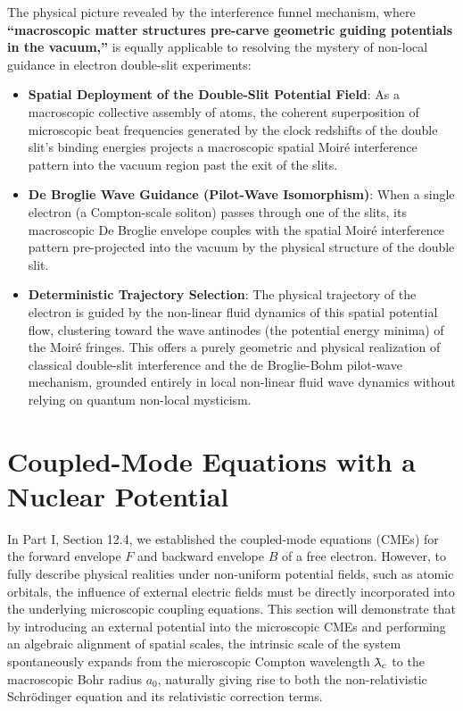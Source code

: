 \documentclass[12pt, a4paper]{article}
\newcommand{\lambdabar}{{\mkern0.75mu\mathchar '26\mkern -9.75mu\lambda}}
\begin{document}
The physical picture revealed by the interference funnel mechanism, where \textbf{``macroscopic matter structures pre-carve geometric guiding potentials in the vacuum,''} is equally applicable to resolving the mystery of non-local guidance in electron double-slit experiments:
\begin{itemize}
    \item \textbf{Spatial Deployment of the Double-Slit Potential Field}: As a macroscopic collective assembly of atoms, the coherent superposition of microscopic beat frequencies generated by the clock redshifts of the double slit's binding energies projects a macroscopic spatial Moiré interference pattern into the vacuum region past the exit of the slits.
    \item \textbf{De Broglie Wave Guidance (Pilot-Wave Isomorphism)}: When a single electron (a Compton-scale soliton) passes through one of the slits, its macroscopic De Broglie envelope couples with the spatial Moiré interference pattern pre-projected into the vacuum by the physical structure of the double slit.
    \item \textbf{Deterministic Trajectory Selection}: The physical trajectory of the electron is guided by the non-linear fluid dynamics of this spatial potential flow, clustering toward the wave antinodes (the potential energy minima) of the Moiré fringes. This offers a purely geometric and physical realization of classical double-slit interference and the de Broglie-Bohm pilot-wave mechanism, grounded entirely in local non-linear fluid wave dynamics without relying on quantum non-local mysticism.
\end{itemize}





\section{Coupled-Mode Equations with a Nuclear Potential}

In Part I, Section 12.4, we established the coupled-mode equations (CMEs) for the forward envelope $F$ and backward envelope $B$ of a free electron. However, to fully describe physical realities under non-uniform potential fields, such as atomic orbitals, the influence of external electric fields must be directly incorporated into the underlying microscopic coupling equations. This section will demonstrate that by introducing an external potential into the microscopic CMEs and performing an algebraic alignment of spatial scales, the intrinsic scale of the system spontaneously expands from the microscopic Compton wavelength $\lambdabar_c$ to the macroscopic Bohr radius $a_0$, naturally giving rise to both the non-relativistic Schrödinger equation and its relativistic correction terms.
\end{document}
